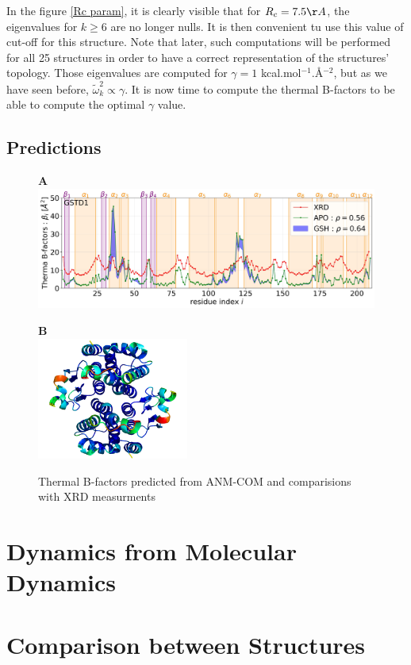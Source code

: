\noindent In the figure \ref{Rc param}, it is clearly visible that for $R_c = 7.5\AA$, the eigenvalues for $k \ge 6$ are no longer nulls. It is then convenient tu use this value of cut-off for this structure. Note that later, such computations will be performed for all 25 structures in order to have a correct representation of the structures' topology. Those eigenvalues are computed for $\gamma = 1$ kcal.mol$^{-1}$.\AA$^{-2}$, but as we have seen before, $\tilde{\omega}_k^2 \propto \gamma$. It is now time to compute the thermal B-factors to be able to compute the optimal $\gamma$ value.

\subsection{Predictions}
\begin{figure}[h!]
	\label{ANM-COM D1}
	\begin{minipage}{.68\linewidth}
		\textbf{A}\\
		\includegraphics[height = 4cm]{figures/GSTD1+GSH_ANM-COM_Bfactors.jpg}
	\end{minipage}
	\begin{minipage}{.30\linewidth}
		\textbf{B}\\
		\includegraphics[height = 4cm]{figures/GSTD1_ANM-COM_Bfactors_structure.png}
	\end{minipage}
	\caption{Thermal B-factors predicted from ANM-COM and comparisions with XRD measurments}
\end{figure}

\section{Dynamics from Molecular Dynamics}

\section{Comparison between Structures}
